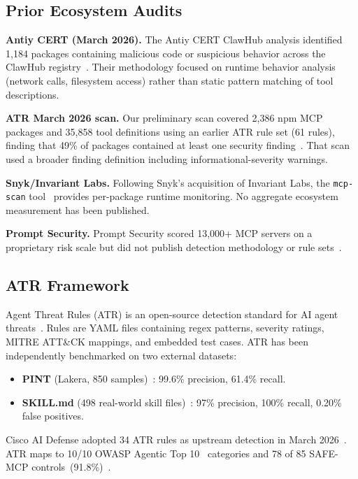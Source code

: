 \documentclass[letterpaper,twocolumn,10pt]{article}
\begin{document}
\subsection{Prior Ecosystem Audits}

\textbf{Antiy CERT (March 2026).}  The Antiy CERT ClawHub analysis
identified 1,184 packages containing malicious code or suspicious
behavior across the ClawHub registry~\cite{antiy2026}.  Their methodology
focused on runtime behavior analysis (network calls, filesystem access)
rather than static pattern matching of tool descriptions.

\textbf{ATR March 2026 scan.}  Our preliminary scan covered 2,386 npm
MCP packages and 35,858 tool definitions using an earlier ATR rule set
(61 rules), finding that 49\% of packages contained at least one security
finding~\cite{atrscan2386}.  That scan used a broader finding definition
including informational-severity warnings.

\textbf{Snyk/Invariant Labs.}  Following Snyk's acquisition of Invariant
Labs, the \texttt{mcp-scan} tool~\cite{snyk2026} provides per-package
runtime monitoring.  No aggregate ecosystem measurement has been
published.

\textbf{Prompt Security.}  Prompt Security scored 13,000+ MCP servers on
a proprietary risk scale but did not publish detection methodology or
rule sets~\cite{promptsec2026}.

\subsection{ATR Framework}

Agent Threat Rules (ATR) is an open-source detection standard for AI
agent threats~\cite{atr,atrv111}.  Rules are YAML files containing regex
patterns, severity ratings, MITRE ATT\&CK mappings, and embedded test
cases.  ATR has been independently benchmarked on two external datasets:

\begin{itemize}[leftmargin=*,nosep]
  \item \textbf{PINT} (Lakera, 850 samples)~\cite{pint}: 99.6\%
    precision, 61.4\% recall.
  \item \textbf{SKILL.md} (498 real-world skill files)~\cite{atrskillbench}:
    97\% precision, 100\% recall, 0.20\% false positives.
\end{itemize}

Cisco AI Defense adopted 34 ATR rules as upstream detection in March
2026~\cite{cisco79}.  ATR maps to 10/10 OWASP Agentic Top
10~\cite{owasp_agentic} categories and 78 of 85 SAFE-MCP
controls~(91.8\%)~\cite{safemcp}.
\end{document}
